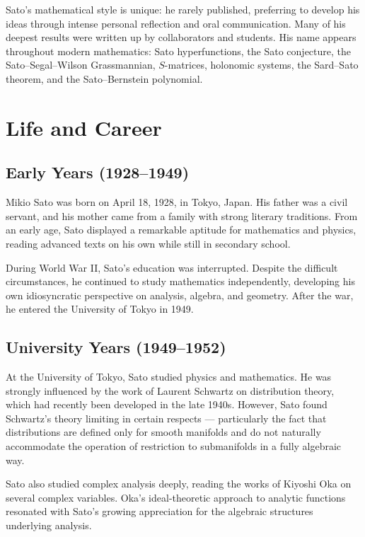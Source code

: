 Sato's mathematical style is unique: he rarely published, preferring to develop his ideas through intense personal reflection and oral communication. Many of his deepest results were written up by collaborators and students. His name appears throughout modern mathematics: Sato hyperfunctions, the Sato conjecture, the Sato--Segal--Wilson Grassmannian, \(S\)-matrices, holonomic systems, the Sard--Sato theorem, and the Sato--Bernstein polynomial.

\section{Life and Career}

\subsection{Early Years (1928--1949)}

Mikio Sato was born on April 18, 1928, in Tokyo, Japan. His father was a civil servant, and his mother came from a family with strong literary traditions. From an early age, Sato displayed a remarkable aptitude for mathematics and physics, reading advanced texts on his own while still in secondary school.

During World War II, Sato's education was interrupted. Despite the difficult circumstances, he continued to study mathematics independently, developing his own idiosyncratic perspective on analysis, algebra, and geometry. After the war, he entered the University of Tokyo in 1949.

\subsection{University Years (1949--1952)}

At the University of Tokyo, Sato studied physics and mathematics. He was strongly influenced by the work of Laurent Schwartz on distribution theory, which had recently been developed in the late 1940s. However, Sato found Schwartz's theory limiting in certain respects --- particularly the fact that distributions are defined only for smooth manifolds and do not naturally accommodate the operation of restriction to submanifolds in a fully algebraic way.

Sato also studied complex analysis deeply, reading the works of Kiyoshi Oka on several complex variables. Oka's ideal-theoretic approach to analytic functions resonated with Sato's growing appreciation for the algebraic structures underlying analysis.

